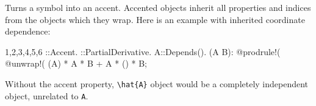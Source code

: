 
Turns a symbol into an accent. Accented objects inherit all properties
and indices from the objects which they wrap. Here is an example with
inherited coordinate dependence:
\begin{screen}{1,2,3,4,5,6}
\hat{#}::Accent.
\partial{#}::PartialDerivative.
A::Depends(\partial).
\partial(A  B):
@prodrule!(%
@unwrap!(%
\partial(A) * A * B + A * \partial() * B;
\end{screen}
Without the accent property, \verb|\hat{A}| object would be a
completely independent object, unrelated to \verb|A|.
